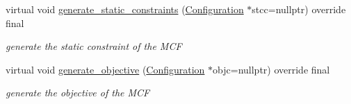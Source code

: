 \begin{Indent}
\begin{DoxyCompactItemize}
virtual void \mbox{\hyperlink{class_s_m_spp__di__unipi__it_1_1_m_c_f_block_a33f94035590874ef8616982e11e7bb43}{generate\+\_\+static\+\_\+constraints}} (\mbox{\hyperlink{class_s_m_spp__di__unipi__it_1_1_configuration}{Configuration}} $\ast$stcc=nullptr) override final
\begin{DoxyCompactList}\small\item\em generate the static constraint of the M\+CF \end{DoxyCompactList}\item 
virtual void \mbox{\hyperlink{class_s_m_spp__di__unipi__it_1_1_m_c_f_block_aa2b7e92a516434c33f247eef8574fb94}{generate\+\_\+objective}} (\mbox{\hyperlink{class_s_m_spp__di__unipi__it_1_1_configuration}{Configuration}} $\ast$objc=nullptr) override final
\begin{DoxyCompactList}\small\item\em generate the objective of the M\+CF \end{DoxyCompactList}\end{DoxyCompactItemize}
\end{Indent}
